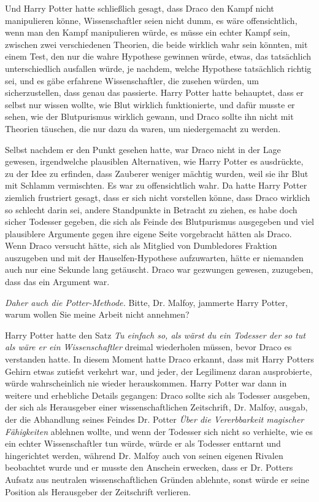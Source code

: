 Und Harry Potter hatte schließlich gesagt, dass Draco den Kampf nicht
manipulieren könne, Wissenschaftler seien nicht dumm, es wäre offensichtlich,
wenn man den Kampf manipulieren würde, es müsse ein echter Kampf sein, zwischen
zwei verschiedenen Theorien, die beide wirklich wahr sein könnten, mit einem
Test, den nur die wahre Hypothese gewinnen würde, etwas, das tatsächlich
unterschiedlich ausfallen würde, je nachdem, welche Hypothese tatsächlich
richtig sei, und es gäbe erfahrene Wissenschaftler, die zusehen würden, um
sicherzustellen, dass genau das passierte. Harry Potter hatte behauptet, dass er
selbst nur wissen wollte, wie Blut wirklich funktionierte, und dafür musste er
sehen, wie der Blutpurismus wirklich gewann, und Draco sollte ihn nicht mit
Theorien täuschen, die nur dazu da waren, um niedergemacht zu werden.

Selbst nachdem er den Punkt gesehen hatte, war Draco nicht in der Lage gewesen,
irgendwelche \glqq plausiblen Alternativen\grqq{}, wie Harry Potter es
ausdrückte, zu der Idee zu erfinden, dass Zauberer weniger mächtig wurden, weil
sie ihr Blut mit Schlamm vermischten. Es war zu offensichtlich wahr. Da hatte
Harry Potter ziemlich frustriert gesagt, dass er sich nicht vorstellen könne,
dass Draco wirklich so schlecht darin sei, andere Standpunkte in Betracht zu
ziehen, es habe doch sicher Todesser gegeben, die sich als Feinde des
Blutpurismus ausgegeben und viel plausiblere Argumente gegen ihre eigene Seite
vorgebracht hätten als Draco. Wenn Draco versucht hätte, sich als Mitglied von
Dumbledores Fraktion auszugeben und mit der Hauselfen-Hypothese aufzuwarten,
hätte er niemanden auch nur eine Sekunde lang getäuscht. Draco war gezwungen
gewesen, zuzugeben, dass das ein Argument war.

\emph{Daher auch die Potter-Methode. } \glqq Bitte, Dr. Malfoy\grqq{}, jammerte
Harry Potter, \glqq warum wollen Sie meine Arbeit nicht annehmen?\grqq{}

Harry Potter hatte den Satz \emph{\glqq Tu einfach so, als wärst du ein Todesser
der so tut als wäre er ein Wissenschaftler\grqq{} } dreimal wiederholen müssen,
bevor Draco es verstanden hatte. In diesem Moment hatte Draco erkannt, dass mit
Harry Potters Gehirn etwas zutiefst verkehrt war, und jeder, der Legilimenz
daran ausprobierte, würde wahrscheinlich nie wieder herauskommen. Harry Potter
war dann in weitere und erhebliche Details gegangen: Draco sollte sich als
Todesser ausgeben, der sich als Herausgeber einer wissenschaftlichen
Zeitschrift, Dr. Malfoy, ausgab, der die Abhandlung seines Feindes Dr. Potter
\emph{\glqq Über die Vererbbarkeit magischer Fähigkeiten\grqq{} } ablehnen
wollte, und wenn der Todesser sich nicht so verhielte, wie es ein echter
Wissenschaftler tun würde, würde er als Todesser enttarnt und hingerichtet
werden, während Dr. Malfoy auch von seinen eigenen Rivalen beobachtet wurde und
er musste den Anschein erwecken, dass er Dr. Potters Aufsatz aus neutralen
wissenschaftlichen Gründen ablehnte, sonst würde er seine Position als
Herausgeber der Zeitschrift verlieren.

